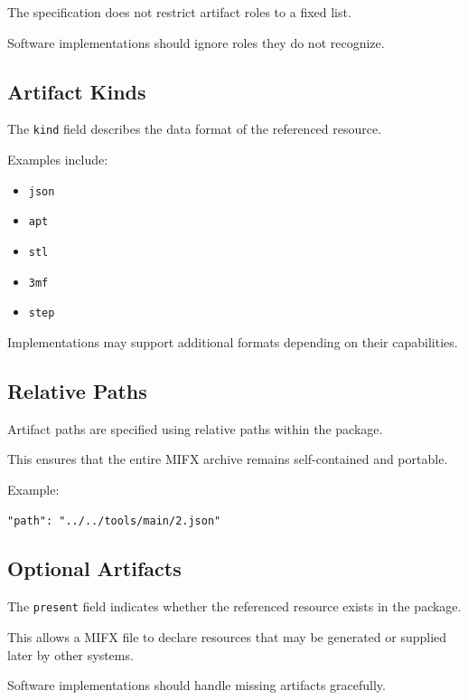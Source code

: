 The specification does not restrict artifact roles to a fixed list.

Software implementations should ignore roles they do not recognize.

\subsection{Artifact Kinds}

The \texttt{kind} field describes the data format of the referenced resource.

Examples include:

\begin{itemize}
\item \texttt{json}
\item \texttt{apt}
\item \texttt{stl}
\item \texttt{3mf}
\item \texttt{step}
\end{itemize}

Implementations may support additional formats depending on their capabilities.

\subsection{Relative Paths}

Artifact paths are specified using relative paths within the package.

This ensures that the entire MIFX archive remains self-contained and portable.

Example:

\begin{verbatim}
"path": "../../tools/main/2.json"
\end{verbatim}

\subsection{Optional Artifacts}

The \texttt{present} field indicates whether the referenced resource exists in the package.

This allows a MIFX file to declare resources that may be generated or supplied later by other systems.

Software implementations should handle missing artifacts gracefully.